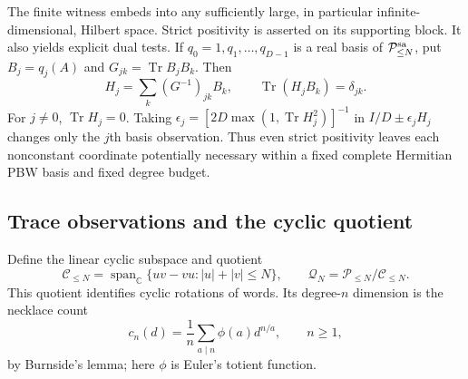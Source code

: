 \documentclass[11pt,a4paper]{amsart}
\numberwithin{equation}{section}
\theoremstyle{definition}
\theoremstyle{remark}
\newcommand{\C}{\mathbb C}
\newcommand{\PP}{\mathcal P}
\DeclareMathOperator{\Tr}{Tr}
\DeclareMathOperator{\Span}{span}
\begin{document}
The finite witness embeds into any sufficiently large, in particular infinite-dimensional, Hilbert space. Strict positivity is asserted on its supporting block. It also yields explicit dual tests. If $q_0=1,q_1,\ldots,q_{D-1}$ is a real basis of $\PP_{\le N}^{\rm sa}$, put $B_j=q_j(A)$ and $G_{jk}=\Tr B_jB_k$. Then
\begin{equation}\label{eq:finite_dual_witness}
 H_j=\sum_k(G^{-1})_{jk}B_k,\qquad \Tr(H_jB_k)=\delta_{jk}.
\end{equation}
For $j\ne0$, $\Tr H_j=0$. Taking
$\epsilon_j=[2D\max(1,\Tr H_j^2)]^{-1}$
in $I/D\pm\epsilon_jH_j$ changes only the $j$th basis observation. Thus even strict positivity leaves each nonconstant coordinate potentially necessary within a fixed complete Hermitian PBW basis and fixed degree budget.

\subsection{Trace observations and the cyclic quotient}
Define the linear cyclic subspace and quotient
\begin{equation}\label{eq:cyclic_quotient}
 \mathscr C_{\le N}=\Span_\C\{uv-vu:|u|+|v|\le N\},\qquad
 \mathscr Q_N=\PP_{\le N}/\mathscr C_{\le N}.
\end{equation}
This quotient identifies cyclic rotations of words. Its degree-$n$ dimension is the necklace count
\begin{equation}\label{eq:necklace_count}
 c_n(d)=\frac1n\sum_{a\mid n}\phi(a)d^{n/a},\qquad n\ge1,
\end{equation}
by Burnside's lemma; here $\phi$ is Euler's totient function.
\end{document}
